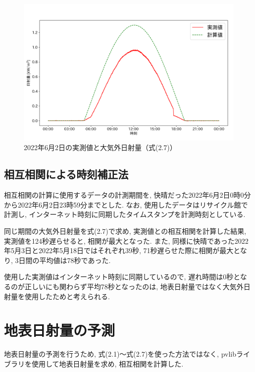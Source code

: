 \begin{figure}[H]
  \hspace*{-1cm}
  \centering
  \includegraphics[width=160mm]{sotu/figure/2/original-20220602-corr.png}
  \caption{2022年6月2日の実測値と大気外日射量（式(2.7)）}
  \label{20220529-p1}
\end{figure}


\subsection{相互相関による時刻補正法}
相互相関の計算に使用するデータの計測期間を, 快晴だった2022年6月2日0時0分から2022年6月2日23時59分までとした. なお, 使用したデータはリサイクル館で計測し, インターネット時刻に同期したタイムスタンプを計測時刻としている.

同じ期間の大気外日射量を式(2.7)で求め, 実測値との相互相関を計算した結果, 実測値を124秒遅らせると, 相関が最大となった. また, 同様に快晴であった2022年5月3日と2022年5月18日ではそれぞれ39秒, 71秒遅らせた際に相関が最大となり, 3日間の平均値は78秒であった.

使用した実測値はインターネット時刻に同期しているので, 遅れ時間は0秒となるのが正しいにも関わらず平均78秒となったのは, 地表日射量ではなく大気外日射量を使用したためと考えられる.

\section{地表日射量の予測}

地表日射量の予測を行うため, 式(2.1)～式(2.7)を使った方法ではなく, pvlibライブラリ\cite {2}を使用して地表日射量を求め, 相互相関を計算した.

